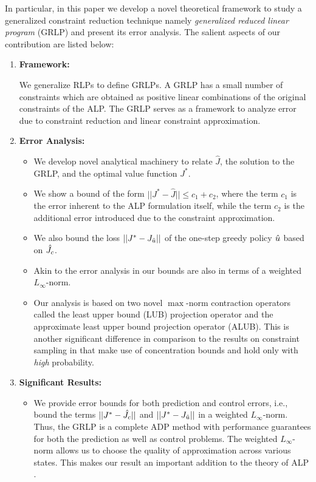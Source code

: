 In particular, in this paper we develop a novel theoretical framework 
	to study a generalized constraint reduction technique 
	namely \emph{generalized reduced linear program} (GRLP) and present its error analysis. 
	The salient aspects of our contribution are listed below:
%
\begin{enumerate}
\item \textbf{Framework:}

We generalize RLPs to define GRLPs. A GRLP has a small number of constraints which are obtained as positive linear combinations of the original constraints of the ALP. 
The GRLP serves as a framework to analyze error due to constraint reduction and linear constraint approximation.
\item \textbf{Error Analysis:}
	\begin{itemize}
		\item We develop novel analytical machinery to relate $\hat{J}$, the solution to the GRLP, and the optimal value function $J^*$. 
		\item We show a bound of the form $||J^*-\hat{J}||\leq c_1+c_2$, 
		where the term $c_1$ is the error inherent to the ALP formulation itself, 
		while the term $c_2$ is the additional error introduced due to the constraint approximation.  
		\item We also bound the loss $||J^*-J_{\hat{u}}||$ of the one-step greedy policy $\hat{u}$ based on $\hat{J}_c$.
		\item Akin to the error analysis in \cite{ALP,CS,SALP} our bounds are also in terms of a weighted $L_\infty$-norm.
		\item Our analysis is based on two novel $\max$-norm contraction operators called the least upper bound (LUB) projection operator and the approximate least upper bound projection operator (ALUB). This is another significant difference in comparison to the results on constraint sampling in \cite{SALP,CS} that make use of concentration bounds and hold only with \emph{high} probability.
\end{itemize}
\item \textbf{Significant Results:}
	\begin{itemize}
		\item We provide error bounds for both prediction and control errors, i.e., bound the terms $||J^*-\hat{J}_c||$ and $||J^*-J_{\hat{u}}||$ in a weighted $L_\infty$-norm. Thus, the GRLP is a complete ADP method with performance guarantees for both the prediction as well as control problems. The weighted $L_\infty$-norm allows us to choose the quality of approximation across various states. This makes our result an important addition to the theory of ALP \cite{ALP,CS,CST,SALP}.

\end{itemize}
\end{enumerate}

